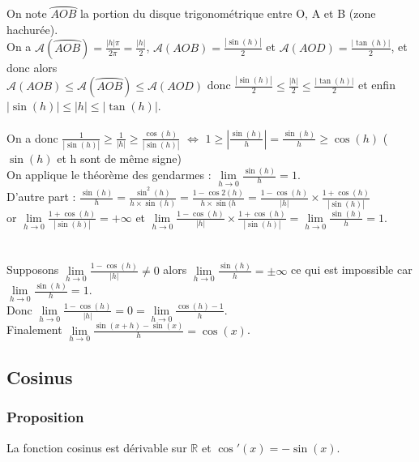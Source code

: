 \documentclass[a4paper,10pt]{book} %
\newcommand{\R}{\mathbb{R}}
\begin{document}
On note $\wideparen{AOB}$ la portion du disque trigonométrique entre O, A et B (zone hachurée).\\

On a $\mathcal{A}(\wideparen{AOB})=\frac{|h|\pi}{2\pi}=\frac{|h|}{2}$, $\mathcal{A}(AOB)=\frac{|\sin(h)|}{2}$ et $\mathcal{A}(AOD)=\frac{|\tan(h)|}{2}$, et donc alors\\
$\mathcal{A}(AOB)\leq \mathcal{A}(\wideparen{AOB})\leq \mathcal{A}(AOD)$ donc $\frac{|\sin(h)|}{2}\leq \frac{|h|}{2} \leq \frac{|\tan(h)|}{2}$ et enfin $|\sin(h)|\leq |h| \leq |\tan(h)|$.\\\\
On a donc $\frac{1}{|\sin(h)|}\geq \frac{1}{|h|}\geq \frac{\cos(h)}{|\sin(h)|}$ $\Leftrightarrow$ $1\geq |\frac{\sin(h)}{h}|=\frac{\sin(h)}{h}\geq \cos(h)$ ($\sin(h)$ et h sont de même signe)\\

On applique le théorème des gendarmes : $\lim\limits_{h\rightarrow 0}\frac{\sin(h)}{h}=1$.\\

D'autre part : $\frac{\sin(h)}{h}=\frac{\sin^{2}(h)}{h\times \sin(h)}=\frac{1-\cos{2}(h)}{h\times \sin(h}=\frac{1-\cos(h)}{|h|} \times \frac{1+\cos(h)}{|\sin(h)|}$\\

or $\lim\limits_{h\rightarrow 0} \frac{1+\cos(h)}{|\sin(h)|}=+\infty$ et $\lim\limits_{h\rightarrow 0}\frac{1-\cos(h)}{|h|}\times \frac{1 +\cos(h)}{|\sin(h)|}=\lim\limits_{h\rightarrow 0}\frac{\sin(h)}{h}=1$.\\\\\\
Supposons $\lim\limits_{h\rightarrow 0} \frac{1-\cos(h)}{|h|}\neq 0$ alors $\lim\limits_{h\rightarrow 0}\frac{\sin(h)}{h}=\pm \infty$ ce qui est impossible car $\lim\limits_{h\rightarrow 0}\frac{\sin(h)}{h}=1$.\\
Donc $\lim\limits_{h \rightarrow 0} \frac{1-\cos(h)}{|h|}=0=\lim\limits_{h\rightarrow 0}\frac{\cos(h)-1}{h}$.\\

Finalement $\lim\limits_{h\rightarrow 0} \frac{\sin(x+h)-\sin(x)}{h}=\cos(x)$.

\newpage	

\subsection{Cosinus}
\subsubsection{Proposition}
La fonction cosinus est dérivable sur $\R$ et $\cos'(x)=-\sin(x)$.
\end{document}
